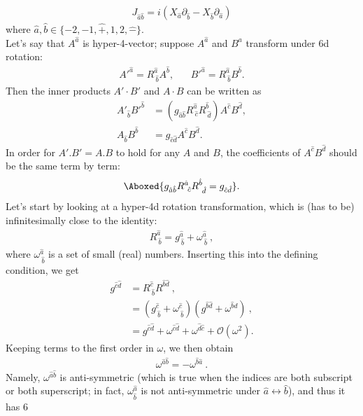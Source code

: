 \documentclass[]{article}
\numberwithin{equation}{section}
\begin{document}
{{\begin{align}
    J_{\hat{a}\hat{b}}=i(X_{\hat{a}}\partial_{\hat{b}}-X_{\hat{b}}\partial_{\hat{a}})
\end{align}
where $\hat{a},\hat{b}\in\{-2,-1,\hat{+},1,2,\hat{-}\}$.\\
Let's say that $A^{\hat{a}}$ is hyper-4-vector; suppose $A^{\hat{a}}$ and $B^a$ transform under 6d rotation:
\begin{align}
    {A'}^{\hat{a}}=R^{\hat{a}}_{~\hat{b}} A^{\hat{b}},&~~~~{B'}^{\hat{a}}=R^{\hat{a}}_{~\hat{b}} B^{\hat{b}}.
\end{align}
Then the inner products $A'\cdot B'$ and $A\cdot B$ can be written as
\begin{align}
    A'_{\hat{b}} B'^{\hat{b}}&=(g_{\hat{a}\hat{b}} R^{\hat{a}}_{~\hat{c}} R^{\hat{b}}_{~\hat{d}})A^{\hat{c}} B^{\hat{d}},\\
    A_{\hat{b}} B^{\hat{b}}&=g_{\hat{c}\hat{d}}A^{\hat{c}} B^{\hat{d}}.
\end{align}
In order for $A'.B'=A.B$ to hold for any $A$ and $B$, the coefficients of $A^{\hat{c}} B^{\hat{d}}$ should be the same term by term:
\begin{align}
    \Aboxed{g_{\hat{a}\hat{b}}R^{\hat{a}}_{~\hat{c}} R^{\hat{b}}_{~\hat{d}}=g_{\hat{c}\hat{d}}}.
\end{align}
Let’s start by looking at a hyper-4d rotation transformation, which is (has to be) infinitesimally close to the identity:
\begin{align}
    R^{\hat{a}}_{~\hat{b}}=g^{\hat{a}}_{~\hat{b}}+\omega^{\hat{a}}_{~\hat{b}}~,
\end{align}
where $\omega^{\hat{a}}_{~\hat{b}}$ is a set of small (real) numbers. Inserting this into the defining condition, we get
\begin{align}
    g^{\hat{c}\hat{d}}&=R^{\hat{c}}_{~\hat{b}}R^{\hat{b}\hat{d}}~,\\
    &=(g^{\hat{c}}_{~\hat{b}}+\omega^{\hat{c}}_{~\hat{b}})(g^{\hat{b}\hat{d}}+\omega^{\hat{b}\hat{d}})~,\nonumber\\
    &=g^{\hat{c}\hat{d}}+\omega^{\hat{c}\hat{d}}+\omega^{\hat{d}\hat{c}}+\mathcal{O}(\omega^2).
\end{align}
Keeping terms to the first order in $\omega$, we then obtain
\begin{align}
    \omega^{\hat{a}\hat{b}}=-\omega^{\hat{b}\hat{a}}~.
\end{align}
Namely, $\omega^{\hat{a}\hat{b}}$ is anti-symmetric (which is true when the indices are both subscript or both superscript; in fact, $\omega^{\hat{a}}_{\hat{b}}$ is not anti-symmetric under $\hat{a}\longleftrightarrow \hat{b}$), and thus it has 6
}}
\end{document}

